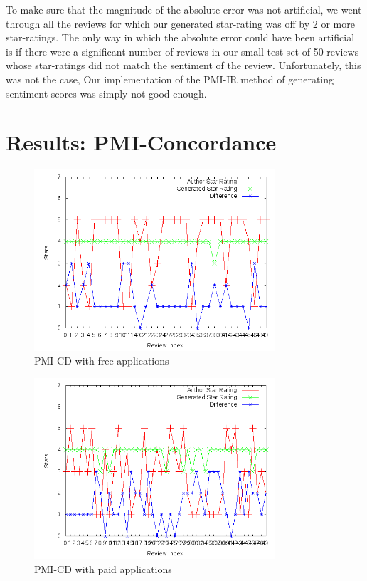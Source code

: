 \documentclass[11pt]{report} %
\begin{document}
To make sure that the magnitude of the absolute error was not artificial, we went through all the reviews for which our generated star-rating was off by 2 or more star-ratings. The only way in which the absolute error could have been artificial is if there were a significant number of reviews in our small test set of 50 reviews whose star-ratings did not match the sentiment of the review. Unfortunately, this was not the case, Our implementation of the PMI-IR method of generating sentiment scores was simply not good enough.

	\section{Results: PMI-Concordance}
	
	\begin{figure}[H]
	\centering
	\includegraphics[width=0.8\textwidth]{data/pmi-cd-free.png}
	\caption{PMI-CD with free applications}
	\label{fig:pmi-cd-free}
	\end{figure}

	\begin{figure}[H]
	\centering
	\includegraphics[width=0.8\textwidth]{data/pmi-cd-paid.png}
	\caption{PMI-CD with paid applications}
	\label{fig:pmi-cd-paid}
	\end{figure}
\end{document}
